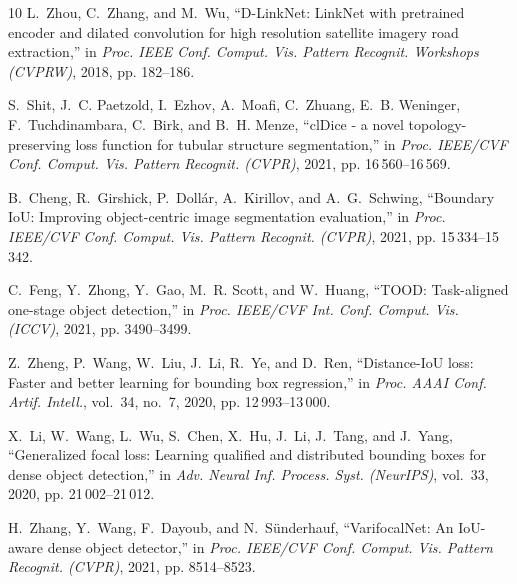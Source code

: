 \documentclass[11pt,a4paper]{article}
\begin{document}
\begin{thebibliography}{10}
L.~Zhou, C.~Zhang, and M.~Wu, ``D-LinkNet: LinkNet with pretrained encoder and dilated convolution for high resolution satellite imagery road extraction,'' in \emph{Proc. IEEE Conf. Comput. Vis. Pattern Recognit. Workshops (CVPRW)}, 2018, pp. 182--186.

S.~Shit, J.~C. Paetzold, I.~Ezhov, A.~Moafi, C.~Zhuang, E.~B. Weninger, F.~Tuchdinambara, C.~Birk, and B.~H. Menze, ``clDice - a novel topology-preserving loss function for tubular structure segmentation,'' in \emph{Proc. IEEE/CVF Conf. Comput. Vis. Pattern Recognit. (CVPR)}, 2021, pp. 16\,560--16\,569.

B.~Cheng, R.~Girshick, P.~Doll{\'a}r, A.~Kirillov, and A.~G.~Schwing, ``Boundary IoU: Improving object-centric image segmentation evaluation,'' in \emph{Proc. IEEE/CVF Conf. Comput. Vis. Pattern Recognit. (CVPR)}, 2021, pp. 15\,334--15\,342.

C.~Feng, Y.~Zhong, Y.~Gao, M.~R. Scott, and W.~Huang, ``TOOD: Task-aligned one-stage object detection,'' in \emph{Proc. IEEE/CVF Int. Conf. Comput. Vis. (ICCV)}, 2021, pp. 3490--3499.

Z.~Zheng, P.~Wang, W.~Liu, J.~Li, R.~Ye, and D.~Ren, ``Distance-IoU loss: Faster and better learning for bounding box regression,'' in \emph{Proc. AAAI Conf. Artif. Intell.}, vol.~34, no.~7, 2020, pp. 12\,993--13\,000.

X.~Li, W.~Wang, L.~Wu, S.~Chen, X.~Hu, J.~Li, J.~Tang, and J.~Yang, ``Generalized focal loss: Learning qualified and distributed bounding boxes for dense object detection,'' in \emph{Adv. Neural Inf. Process. Syst. (NeurIPS)}, vol.~33, 2020, pp. 21\,002--21\,012.

H.~Zhang, Y.~Wang, F.~Dayoub, and N.~S{\"u}nderhauf, ``VarifocalNet: An IoU-aware dense object detector,'' in \emph{Proc. IEEE/CVF Conf. Comput. Vis. Pattern Recognit. (CVPR)}, 2021, pp. 8514--8523.

\end{thebibliography}
\end{document}
